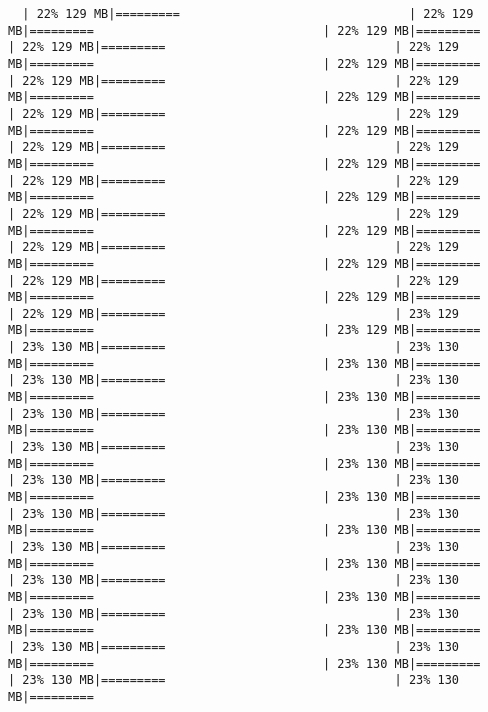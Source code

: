 \documentclass[
]{article}
\begin{document}
\begin{verbatim}
  | 22% 129 MB|=========                                | 22% 129 MB|=========                                | 22% 129 MB|=========                                | 22% 129 MB|=========                                | 22% 129 MB|=========                                | 22% 129 MB|=========                                | 22% 129 MB|=========                                | 22% 129 MB|=========                                | 22% 129 MB|=========                                | 22% 129 MB|=========                                | 22% 129 MB|=========                                | 22% 129 MB|=========                                | 22% 129 MB|=========                                | 22% 129 MB|=========                                | 22% 129 MB|=========                                | 22% 129 MB|=========                                | 22% 129 MB|=========                                | 22% 129 MB|=========                                | 22% 129 MB|=========                                | 22% 129 MB|=========                                | 22% 129 MB|=========                                | 22% 129 MB|=========                                | 22% 129 MB|=========                                | 22% 129 MB|=========                                | 22% 129 MB|=========                                | 22% 129 MB|=========                                | 22% 129 MB|=========                                | 22% 129 MB|=========                                | 23% 129 MB|=========                                | 23% 129 MB|=========                                | 23% 130 MB|=========                                | 23% 130 MB|=========                                | 23% 130 MB|=========                                | 23% 130 MB|=========                                | 23% 130 MB|=========                                | 23% 130 MB|=========                                | 23% 130 MB|=========                                | 23% 130 MB|=========                                | 23% 130 MB|=========                                | 23% 130 MB|=========                                | 23% 130 MB|=========                                | 23% 130 MB|=========                                | 23% 130 MB|=========                                | 23% 130 MB|=========                                | 23% 130 MB|=========                                | 23% 130 MB|=========                                | 23% 130 MB|=========                                | 23% 130 MB|=========                                | 23% 130 MB|=========                                | 23% 130 MB|=========                                | 23% 130 MB|=========                                | 23% 130 MB|=========                                | 23% 130 MB|=========                                | 23% 130 MB|=========                                | 23% 130 MB|=========                                | 23% 130 MB|=========                                | 23% 130 MB|=========                                | 23% 130 MB|=========                                | 23% 130 MB|=========                                | 23% 130 MB|=========                                | 23% 130 MB|=========                                | 23% 130 MB|========= 
\end{verbatim}
\end{document}
